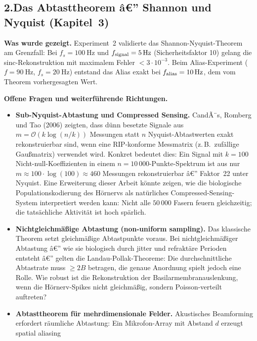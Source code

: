 ﻿\documentclass[12pt,a4paper,titlepage]{report}
\begin{document}
\subsection*{2.\enspace Das Abtasttheorem â€” Shannon und Nyquist
(Kapitel~3)}

\textbf{Was wurde gezeigt.}
Experiment~2 validierte das Shannon-Nyquist-Theorem am Grenzfall:
Bei $f_s=\SI{100}{\hertz}$ und $f_{\rm signal}=\SI{5}{\hertz}$
(Sicherheitsfaktor 10) gelang die sinc-Rekonstruktion mit
maximalem Fehler $< 3\cdot 10^{-3}$.
Beim Alias-Experiment ($f=\SI{90}{\hertz}$, $f_s=\SI{20}{\hertz}$)
entstand das Alias exakt bei $f_{\rm alias}=\SI{10}{\hertz}$,
dem vom Theorem vorhergesagten Wert.

\textbf{Offene Fragen und weiterführende Richtungen.}
\begin{itemize}[leftmargin=2em]
  \item \textbf{Sub-Nyquist-Abtastung und Compressed Sensing.}
    CandÃ¨s, Romberg und Tao (2006) zeigten, dass dünn besetzte Signale
    aus $m=\mathcal{O}(k\log(n/k))$ Messungen statt $n$ Nyquist-Abtastwerten
    exakt rekonstruierbar sind, wenn eine RIP-konforme Messmatrix
    (z.\,B.\ zufällige Gaußmatrix) verwendet wird.
    Konkret bedeutet dies: Ein Signal mit $k=100$ Nicht-null-Koeffizienten
    in einem $n=10\,000$-Punkte-Spektrum ist aus nur
    $m\approx100\cdot\log(100)\approx 460$ Messungen rekonstruierbar â€”
    Faktor~22 unter Nyquist.
    Eine Erweiterung dieser Arbeit könnte zeigen, wie die biologische
    Populationskodierung des Hörnervs als natürliches Compressed-Sensing-System
    interpretiert werden kann:
    Nicht alle $50\,000$ Fasern feuern gleichzeitig; die tatsächliche
    Aktivität ist hoch spärlich.
  \item \textbf{Nichtgleichmäßige Abtastung (non-uniform sampling).}
    Das klassische Theorem setzt gleichmäßige Abtastpunkte voraus.
    Bei nichtgleichmäßiger Abtastung â€” wie sie biologisch durch
    jitter und refraktäre Perioden entsteht â€” gelten die
    Landau-Pollak-Theoreme:
    Die durchschnittliche Abtastrate muss $\geq 2B$ betragen,
    die genaue Anordnung spielt jedoch eine Rolle.
    Wie robust ist die Rekonstruktion der Basilarmembranauslenkung,
    wenn die Hörnerv-Spikes nicht gleichmäßig, sondern Poisson-verteilt auftreten?
  \item \textbf{Abtasttheorem für mehrdimensionale Felder.}
    Akustisches Beamforming erfordert räumliche Abtastung:
    Ein Mikrofon-Array mit Abstand $d$ erzeugt spatial aliasing

\end{itemize}
\end{document}

